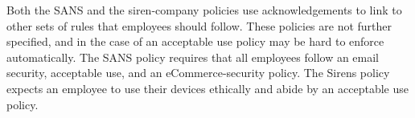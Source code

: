 \documentclass{llncs}
\newenvironment{policyrule}[1]{%
  \begin{mdframed}[]\footnotesize
      \noindent\textbf{\sffamily #1}:~\itshape%
}{%
  \end{mdframed}
}
\begin{document}

Both the SANS and the siren-company policies use acknowledgements to link to other sets of rules that employees should follow.
These policies are not further specified, and in the case of an acceptable use policy may be hard to enforce automatically.
The SANS policy requires that all employees follow an email security, acceptable use, and an eCommerce-security policy.
The Sirens policy expects an employee to use their devices ethically and abide by an acceptable use policy.
\end{document}
